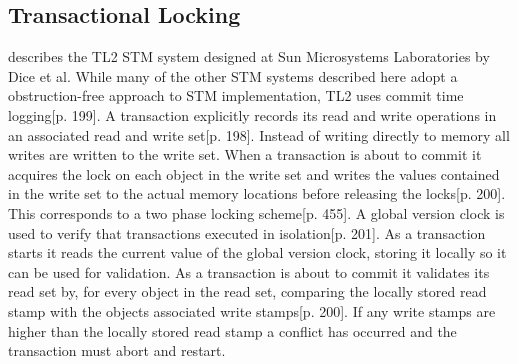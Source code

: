 \subsection{Transactional Locking }
\cite{dice2006transactional} describes the TL2 \ac{STM} system designed at Sun Microsystems Laboratories by Dice et al. While many of the other \ac{STM} systems described here adopt a obstruction-free approach to \ac{STM} implementation, TL2 uses commit time logging\cite{dice2006transactional}[p. 199]. A transaction explicitly records its read and write operations in an associated read and write set\cite{dice2006transactional}[p. 198]. Instead of writing directly to memory all writes are written to the write set. When a transaction is about to commit it acquires the lock on each object in the write set and writes the values contained in the write set to the actual memory locations before releasing the locks\cite{dice2006transactional}[p. 200]. This corresponds to a two phase locking scheme\cite{tanenbaum2008modern}[p. 455]. A global version clock is used to verify that transactions executed in isolation\cite{dice2006transactional}[p. 201]. As a transaction starts it reads the current value of the global version clock, storing it locally so it can be used for validation. As a transaction is about to commit it validates its read set by, for every object in the read set, comparing the locally stored read stamp with the objects associated write stamps\cite{dice2006transactional}[p. 200]. If any write stamps are higher than the locally stored read stamp a conflict has occurred and the transaction must abort and restart. 

